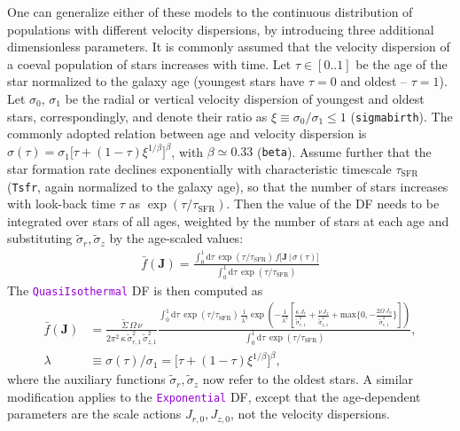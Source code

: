 \documentclass[12pt]{article}
\newcommand{\ttt}[1]{\textcolor{darkviolet}{\texttt{#1}}}
\newcommand{\ppp}[1]{\textcolor{darkolive} {\texttt{#1}}}
\renewcommand{\d}{\mathrm{d}}
\newcommand{\bJ}{\boldsymbol{J}}
\begin{document}
One can generalize either of these models to the continuous distribution of populations with different velocity dispersions, by introducing three additional dimensionless parameters. It is commonly assumed that the velocity dispersion of a coeval population of stars increases with time. Let $\tau\in[0..1]$ be the age of the star normalized to the galaxy age (youngest stars have $\tau=0$ and oldest -- $\tau=1$). Let $\sigma_0$, $\sigma_1$ be the radial or vertical velocity dispersion of youngest and oldest stars, correspondingly, and denote their ratio as $\xi\equiv \sigma_0/\sigma_1 \le 1$ (\ppp{sigmabirth}). The commonly adopted relation between age and velocity dispersion \cite{AumerBinney2009} is $\sigma(\tau) = \sigma_1 \big[\tau + (1-\tau)\xi^{1/\beta} \big]^\beta$, with $\beta\simeq 0.33$ (\ppp{beta}). Assume further that the star formation rate declines exponentially with characteristic timescale $\tau_\mathrm{SFR}$ (\ppp{Tsfr}, again normalized to the galaxy age), so that the number of stars increases with look-back time $\tau$ as $\exp(\tau/\tau_\mathrm{SFR})$. Then the value of the DF needs to be integrated over stars of all ages, weighted by the number of stars at each age and substituting $\tilde\sigma_r, \tilde\sigma_z$ by the age-scaled values:
\begin{align*}
\bar f(\bJ) = \frac{\int_0^1 \d \tau\, \exp(\tau/\tau_\mathrm{SFR})\,
f\big[ \bJ \,|\, \sigma(\tau) \big] }{\int_0^1 \d \tau\, \exp(\tau/\tau_\mathrm{SFR})}
\end{align*}
The \ttt{QuasiIsothermal} DF is then computed as
\begin{align*}
\bar f(\bJ) &= \frac{\tilde\Sigma\,\Omega\,\nu}
{2\pi^2\,\kappa\,\tilde\sigma_{r,1}^2\,\tilde\sigma_{z,1}^2}
\frac{ \displaystyle \int_0^1 \d \tau\, \exp(\tau/\tau_\mathrm{SFR})\,
\frac{1}{\lambda^4} \exp\left(-\frac{1}{\lambda^2}
\left[ \frac{\kappa\,J_r}{\tilde\sigma_{r,1}^2} + \frac{\nu\,J_z}{\tilde\sigma_{z,1}^2} +
\mathrm{max}\bigg\{0, -\frac{2\Omega\,J_\phi}{\tilde\sigma_{r,1}^2}\bigg\} \right]\right)}
{ \int_0^1 \d \tau\, \exp(\tau/\tau_\mathrm{SFR}) } ,\\
\lambda &\equiv \sigma(\tau)/\sigma_1 = \big[\tau + (1-\tau)\xi^{1/\beta}\big]^\beta ,
\end{align*}
where the auxiliary functions $\tilde\sigma_r,\tilde\sigma_z$ now refer to the oldest stars. A similar modification applies to the \ttt{Exponential} DF, except that the age-dependent parameters are the scale actions $J_{r,0}, J_{z,0}$, not the velocity dispersions.
\end{document}
